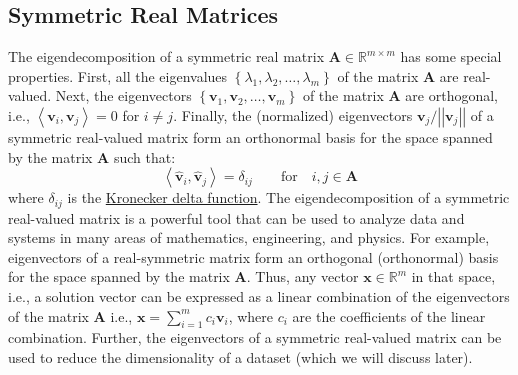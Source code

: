 \documentclass{article}[11pt]
\newcommand{\norm}[1]{\left|\left|#1\right|\right|}
\begin{document}
\subsection{Symmetric Real Matrices}
The eigendecomposition of a symmetric real matrix $\mathbf{A}\in\mathbb{R}^{m\times{m}}$ has some special properties. 
First, all the eigenvalues $\left\{\lambda_{1},\lambda_{2},\dots,\lambda_{m}\right\}$ of the matrix $\mathbf{A}$ are real-valued.
Next, the eigenvectors $\left\{\mathbf{v}_{1},\mathbf{v}_{2},\dots,\mathbf{v}_{m}\right\}$ of the matrix $\mathbf{A}$ are orthogonal, i.e., $\left<\mathbf{v}_{i},\mathbf{v}_{j}\right> = 0$ for $i\neq{j}$.
Finally, the (normalized) eigenvectors $\mathbf{v}_{j}/\norm{\mathbf{v}_{j}}$ of a symmetric real-valued matrix 
form an orthonormal basis for the space spanned by the matrix $\mathbf{A}$ such that:
\begin{equation}
\left<\hat{\mathbf{v}}_{i},\hat{\mathbf{v}}_{j}\right> = \delta_{ij}\qquad\text{for}\quad{i,j\in\mathbf{A}}
\end{equation}
where $\delta_{ij}$ is the \href{https://en.wikipedia.org/wiki/Kronecker_delta}{Kronecker delta function}. The eigendecomposition of a symmetric real-valued matrix is a powerful tool that can be used to analyze data and systems in many areas of mathematics, engineering, and physics.
For example, eigenvectors of a real-symmetric matrix form an orthogonal (orthonormal) basis for the space spanned by the matrix $\mathbf{A}$.
Thus, any vector $\mathbf{x}\in\mathbb{R}^{m}$  in that space, i.e., a solution vector can be expressed as a linear combination of the eigenvectors of the matrix $\mathbf{A}$
i.e., $\mathbf{x} = \sum_{i=1}^{m}c_{i}\mathbf{v}_{i}$, where $c_{i}$ are the coefficients of the linear combination.
Further, the eigenvectors of a symmetric real-valued matrix can be used to reduce the dimensionality of a dataset (which we will discuss later).
\end{document}

